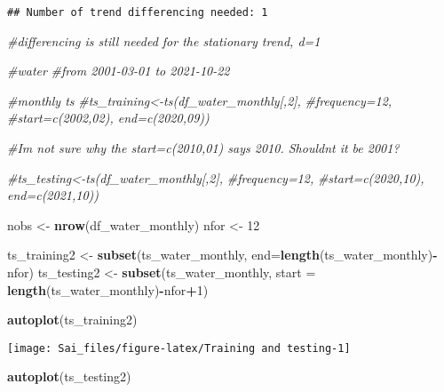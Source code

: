 \documentclass[
]{article}
\newenvironment{Shaded}{\begin{snugshade}}{\end{snugshade}}
\newcommand{\AttributeTok}[1]{\textcolor[rgb]{0.13,0.29,0.53}{#1}}
\newcommand{\CommentTok}[1]{\textcolor[rgb]{0.56,0.35,0.01}{\textit{#1}}}
\newcommand{\DecValTok}[1]{\textcolor[rgb]{0.00,0.00,0.81}{#1}}
\newcommand{\FunctionTok}[1]{\textcolor[rgb]{0.13,0.29,0.53}{\textbf{#1}}}
\newcommand{\NormalTok}[1]{#1}
\newcommand{\OtherTok}[1]{\textcolor[rgb]{0.56,0.35,0.01}{#1}}
\newcommand{\SpecialCharTok}[1]{\textcolor[rgb]{0.81,0.36,0.00}{\textbf{#1}}}
\begin{document}
\begin{verbatim}
## Number of trend differencing needed: 1
\end{verbatim}

\begin{Shaded}
\begin{Highlighting}[]
\CommentTok{\#differencing is still needed for the stationary trend, d=1}
\end{Highlighting}
\end{Shaded}

\begin{Shaded}
\begin{Highlighting}[]
\CommentTok{\#water}
\CommentTok{\#from 2001{-}03{-}01 to 2021{-}10{-}22}

\CommentTok{\#monthly ts}
\CommentTok{\#ts\_training\textless{}{-}ts(df\_water\_monthly[,2],}
                \CommentTok{\#frequency=12,}
                \CommentTok{\#start=c(2002,02), end=c(2020,09))}

\CommentTok{\#I\textquotesingle{}m not sure why the start=c(2010,01) says 2010. Shouldn\textquotesingle{}t it be 2001?}


\CommentTok{\#ts\_testing\textless{}{-}ts(df\_water\_monthly[,2],}
               \CommentTok{\#frequency=12,}
               \CommentTok{\#start=c(2020,10), end=c(2021,10))}

\NormalTok{nobs }\OtherTok{\textless{}{-}} \FunctionTok{nrow}\NormalTok{(df\_water\_monthly)}
\NormalTok{nfor }\OtherTok{\textless{}{-}} \DecValTok{12}

\NormalTok{ts\_training2 }\OtherTok{\textless{}{-}} \FunctionTok{subset}\NormalTok{(ts\_water\_monthly, }\AttributeTok{end=}\FunctionTok{length}\NormalTok{(ts\_water\_monthly)}\SpecialCharTok{{-}}\NormalTok{nfor)}
\NormalTok{ts\_testing2 }\OtherTok{\textless{}{-}} \FunctionTok{subset}\NormalTok{(ts\_water\_monthly, }\AttributeTok{start =} \FunctionTok{length}\NormalTok{(ts\_water\_monthly)}\SpecialCharTok{{-}}\NormalTok{nfor}\SpecialCharTok{+}\DecValTok{1}\NormalTok{)}

\FunctionTok{autoplot}\NormalTok{(ts\_training2)}
\end{Highlighting}
\end{Shaded}

\begin{center}\texttt{[image: Sai\_files/figure-latex/Training and testing-1]} \end{center}

\begin{Shaded}
\begin{Highlighting}[]
\FunctionTok{autoplot}\NormalTok{(ts\_testing2)}
\end{Highlighting}
\end{Shaded}
\end{document}
